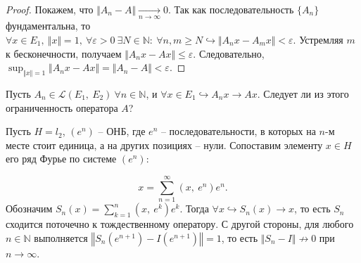 \begin{proof}
Покажем, что $\displaystyle \Vert A_{n} -A\Vert \xrightarrow[n\rightarrow \infty ]{} 0$. Так как последовательность $\displaystyle \{A_{n}\}$ фундаментальна, то $\displaystyle \forall x\in E_{1} ,\ \Vert x\Vert =1,\ \forall \varepsilon  >0\ \exists N\in \mathbb{N} :\ \forall n,m\geqslant N\hookrightarrow \Vert A_{n} x-A_{m} x\Vert < \varepsilon $. Устремляя $\displaystyle m$ к бесконечности, получаем $\displaystyle \Vert A_{n} x-A x\Vert \leqslant \varepsilon $. Следовательно, $\displaystyle \sup _{\Vert x\Vert =1}\Vert A_{n} x-A x\Vert =\Vert A_{n} -A\Vert < \varepsilon $.
\end{proof}
\begin{exercise}
Пусть $\displaystyle A_{n} \in \mathcal{L}( E_{1} ,\ E_{2}) \ \forall n\in \mathbb{N}$, и $\displaystyle \forall x\in E_{1} \hookrightarrow A_{n} x\rightarrow Ax$. Следует ли из этого ограниченность оператора $\displaystyle A$?
\end{exercise}
\begin{example}
Пусть $\displaystyle H=l_{2}$, $\displaystyle \left( e^{n}\right)$ -- ОНБ, где $\displaystyle e^{n}$ -- последовательности, в которых на $\displaystyle n$-м месте стоит единица, а на других позициях -- нули. Сопоставим элементу $\displaystyle x\in H$ его ряд Фурье по системе $\displaystyle \left( e^{n}\right)$:


\begin{equation*}
x=\sum _{n=1}^{\infty }\left( x,\ e^{n}\right) e^{n} .
\end{equation*}
Обозначим $\displaystyle S_{n}( x) =\sum _{k=1}^{n}\left( x,\ e^{k}\right) e^{k}$. Тогда $\displaystyle \forall x\hookrightarrow S_{n}( x)\rightarrow x$, то есть $\displaystyle S_{n}$ сходится поточечно к тождественному оператору. С другой стороны, для любого $\displaystyle n\in \mathbb{N}$ выполняется $\displaystyle \left\Vert S_{n}\left( e^{n+1}\right) -I\left( e^{n+1}\right)\right\Vert =1$, то есть $\displaystyle \Vert S_{n} -I\Vert \nrightarrow 0$ при $\displaystyle n\rightarrow \infty $.

\end{example}